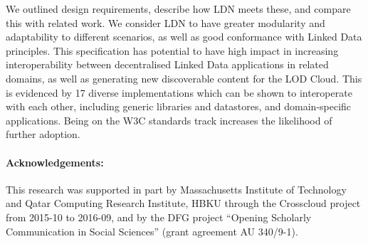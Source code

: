 \documentclass[a4paper]{llncs}
\begin{document}
\par We outlined design requirements, describe how LDN meets these, and compare this with related work. We consider LDN to have greater modularity and adaptability to different scenarios, as well as good conformance with Linked Data principles. This specification has potential to have high impact in increasing interoperability between decentralised Linked Data applications in related domains, as well as generating new discoverable content for the LOD Cloud. This is evidenced by 17 diverse implementations which can be shown to interoperate with each other, including generic libraries and datastores, and domain-specific applications. Being on the W3C standards track increases the likelihood of further adoption.


\paragraph{Acknowledgements:}
This research was supported in part by Massachusetts Institute of Technology and Qatar Computing Research Institute, HBKU through the Crosscloud project from 2015-10 to 2016-09, and by the DFG project “Opening Scholarly Communication in Social Sciences” (grant agreement AU 340/9-1).
\end{document}
